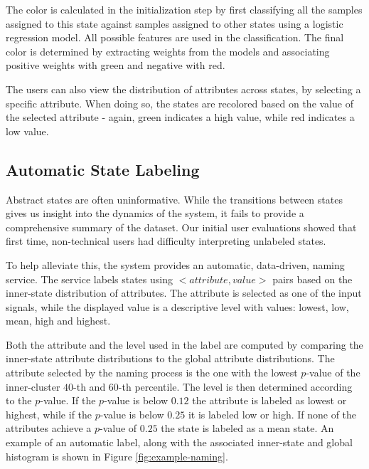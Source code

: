 The color is calculated in the initialization step by first classifying all the samples assigned to this state 
against samples assigned to other states using a logistic regression model. All possible features are  used in the 
classification.%
The final color is determined by extracting weights from the models and associating positive weights
with green and negative with red.

The users can also view the distribution of attributes across states, by selecting a specific attribute.
When doing so, the states are recolored based on the value of the selected attribute - again, green indicates
a high value, while red indicates a low value.


\subsection{Automatic State Labeling}

Abstract states are often uninformative. While the transitions between states gives us insight into the dynamics of the system, it fails to provide a comprehensive summary 
of the dataset. Our initial user evaluations showed that first time, non-technical users had difficulty interpreting unlabeled states. %

To help alleviate this, the system provides an automatic, data-driven, naming service. The service labels states using $<attribute,value>$ pairs based on the inner-state distribution of attributes. The attribute is selected as one of the input signals, while the displayed value is a descriptive level with values: lowest, low, mean, high and highest.

Both the attribute and the level used in the label are computed by comparing the inner-state attribute
distributions to the global attribute distributions. The attribute selected by the naming process is
the one with the lowest $p$-value of the inner-cluster $40$-th and $60$-th percentile. The level is
then determined according to the $p$-value. If the $p$-value is below $0.12$ the attribute is labeled
as lowest or highest, while if the $p$-value is below $0.25$ it is labeled low or high. If none of the
attributes achieve a $p$-value of $0.25$ the state is labeled as a mean state. An example of an automatic
label, along with the associated inner-state and global histogram is shown in Figure \ref{fig:example-naming}.


